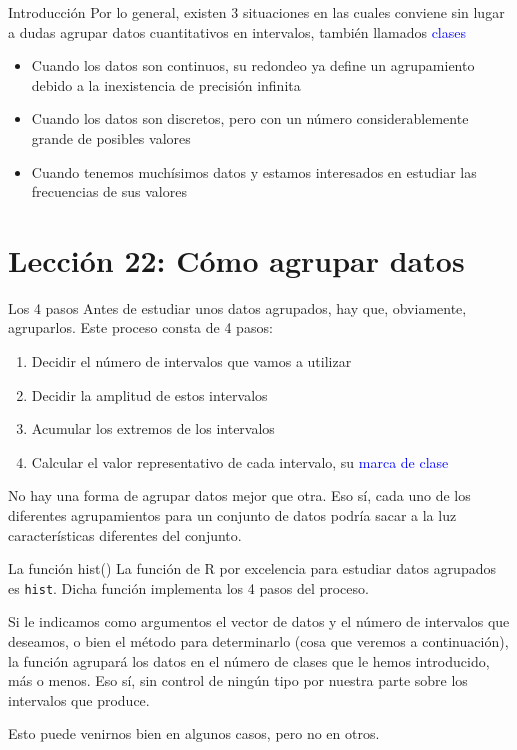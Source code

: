 \documentclass[
  ignorenonframetext,
  aspectratio=169]{beamer}
\providecommand{\tightlist}{%
  \setlength{\itemsep}{0pt}\setlength{\parskip}{0pt}}
\newcommand\blue[1]{\textcolor{blue}{#1}}
\begin{document}
\begin{frame}{Introducción}
\label{introducciuxf3n-3}
Por lo general, existen 3 situaciones en las cuales conviene sin lugar a
dudas agrupar datos cuantitativos en intervalos, también llamados
\blue{clases}

\begin{itemize}
\tightlist
\item
  Cuando los datos son continuos, su redondeo ya define un agrupamiento
  debido a la inexistencia de precisión infinita
\item
  Cuando los datos son discretos, pero con un número considerablemente
  grande de posibles valores
\item
  Cuando tenemos muchísimos datos y estamos interesados en estudiar las
  frecuencias de sus valores
\end{itemize}
\end{frame}

\section{Lección 22: Cómo agrupar
datos}\label{lecciuxf3n-22-cuxf3mo-agrupar-datos}

\begin{frame}{Los 4 pasos}
\label{los-4-pasos}
Antes de estudiar unos datos agrupados, hay que, obviamente, agruparlos.
Este proceso consta de 4 pasos:

\begin{enumerate}
\tightlist
\item
  Decidir el número de intervalos que vamos a utilizar
\item
  Decidir la amplitud de estos intervalos
\item
  Acumular los extremos de los intervalos
\item
  Calcular el valor representativo de cada intervalo, su
  \blue{marca de clase}
\end{enumerate}

No hay una forma de agrupar datos mejor que otra. Eso sí, cada uno de
los diferentes agrupamientos para un conjunto de datos podría sacar a la
luz características diferentes del conjunto.
\end{frame}

\begin{frame}[fragile]{La función hist()}
\label{la-funciuxf3n-hist}
La función de R por excelencia para estudiar datos agrupados es
\texttt{hist}. Dicha función implementa los 4 pasos del proceso.

Si le indicamos como argumentos el vector de datos y el número de
intervalos que deseamos, o bien el método para determinarlo (cosa que
veremos a continuación), la función agrupará los datos en el número de
clases que le hemos introducido, más o menos. Eso sí, sin control de
ningún tipo por nuestra parte sobre los intervalos que produce.

Esto puede venirnos bien en algunos casos, pero no en otros.
\end{frame}
\end{document}
